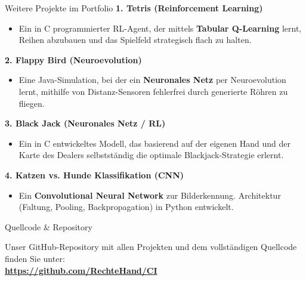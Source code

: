 \documentclass[aspectratio=169]{beamer}
\begin{document}
\begin{frame}{Weitere Projekte im Portfolio}
\small
\textbf{1. Tetris (Reinforcement Learning)}
\begin{itemize}
    \item Ein in C programmierter RL-Agent, der mittels \textbf{Tabular Q-Learning} lernt, Reihen abzubauen und das Spielfeld strategisch flach zu halten.
\end{itemize}

\vspace{0.1cm}
\textbf{2. Flappy Bird (Neuroevolution)}
\begin{itemize}
    \item Eine Java-Simulation, bei der ein \textbf{Neuronales Netz} per Neuroevolution lernt, mithilfe von Distanz-Sensoren fehlerfrei durch generierte Röhren zu fliegen.
\end{itemize}

\vspace{0.1cm}
\textbf{3. Black Jack (Neuronales Netz / RL)}
\begin{itemize}
    \item Ein in C entwickeltes Modell, das basierend auf der eigenen Hand und der Karte des Dealers selbstständig die optimale Blackjack-Strategie erlernt.
\end{itemize}

\vspace{0.1cm}
\textbf{4. Katzen vs. Hunde Klassifikation (CNN)}
\begin{itemize}
    \item Ein \textbf{Convolutional Neural Network} zur Bilderkennung. Architektur (Faltung, Pooling, Backpropagation) in Python entwickelt.
\end{itemize}
\end{frame}

\begin{frame}{Quellcode \& Repository}
\begin{center}
\vspace{1cm}
\Large Unser GitHub-Repository mit allen Projekten und dem vollständigen Quellcode finden Sie unter:\\
\vspace{1cm}
\textbf{\url{https://github.com/RechteHand/CI}}
\end{center}
\end{frame}
\end{document}
